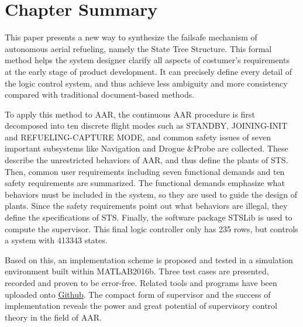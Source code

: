 \section{Chapter Summary}
This paper presents a new way to synthesize the failsafe mechanism of autonomous aerial refueling, namely the State Tree Structure. This formal method helps the system designer clarify all aspects of costumer's requirements at the early stage of product development. It can precisely define every detail of the logic control system, and thus achieve less ambiguity and more consistency compared with traditional document-based methods.

To apply this method to AAR, the continuous AAR procedure is first decomposed into ten discrete flight modes such as STANDBY, JOINING-INIT and REFUELING-CAPTURE MODE, and common safety issues of seven important subsystems like Navigation and Drogue \&Probe are collected. These describe the unrestricted behaviors of AAR, and thus define the plants of STS. Then, common user requirements including  seven functional demands and ten safety requirements are summarized. The functional demands emphasize what behaviors must be included in the system, so they are used to guide the design of plants. Since the safety requirements point out what behaviors are illegal, they define the specifications of STS. Finally, the software package STSLib is used to compute the supervisor. This final logic controller only has 235 rows, but controls a system with 413343 states.

Based on this, an implementation scheme is proposed and tested in a simulation environment built within MATLAB2016b. Three test cases are presented, recorded and proven to be error-free. Related tools and programs have been uploaded onto  \href{https://github.com/KevinDong0810/Failsafe-Design-for-AAR-using-STS}{Github}. The compact form of supervisor and the success of implementation reveals the power and great potential of supervisory control theory in the field of AAR. 





